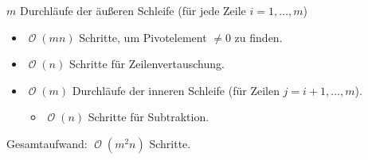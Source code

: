 \documentclass[a4paper,12pt]{article}
\DeclareMathOperator{\BigO}{\mathcal O}
\theoremstyle{definition}
\begin{document}
	$m$ Durchläufe der äußeren Schleife (für jede Zeile $i = 1, \ldots, m$)
	\begin{itemize}
		\item $\BigO(mn)$ Schritte, um Pivotelement $\neq 0$ zu finden.
		\item $\BigO(n)$ Schritte für Zeilenvertauschung.
		\item $\BigO(m)$ Durchläufe der inneren Schleife (für Zeilen $j = i + 1, \ldots, m$).
		\begin{itemize}
			\item $\BigO(n)$ Schritte für Subtraktion.
		\end{itemize}
	\end{itemize}
	Gesamtaufwand: $\BigO(m^2n)$ Schritte.
\end{document}
